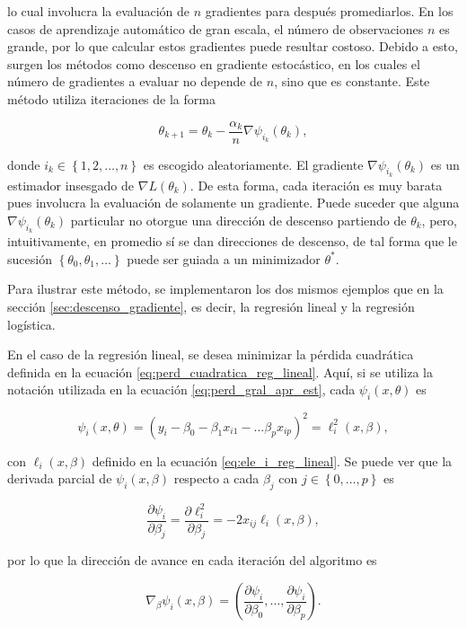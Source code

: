 lo cual involucra la evaluación de $n$ gradientes para después promediarlos. En los casos de aprendizaje automático de gran escala, el número de observaciones $n$ es grande, por lo que calcular estos gradientes puede resultar costoso. Debido a esto, surgen los métodos como descenso en gradiente estocástico, en los cuales el número de gradientes a evaluar no depende de $n$, sino que es constante. Este método utiliza iteraciones de la forma

\[
  \theta_{k+1} = \theta_k - \frac{\alpha_k}{n} \nabla \psi_{i_k}(\theta_k),
\]

donde $i_k \in \left\{1, 2, \hdots, n \right\}$ es escogido aleatoriamente. El gradiente $\nabla \psi_{i_k}(\theta_k)$ es un estimador insesgado de $\nabla L(\theta_k)$. De esta forma, cada iteración es muy barata pues involucra la evaluación de solamente un gradiente. Puede suceder que alguna $\nabla \psi_{i_k}(\theta_k)$ particular no otorgue una dirección de descenso partiendo de $\theta_k$, pero, intuitivamente, en promedio sí se dan direcciones de descenso, de tal forma que le sucesión $\left\{ \theta_0, \theta_1, \hdots \right\}$ puede ser guiada a un minimizador $\theta^*$.

Para ilustrar este método, se implementaron los dos mismos ejemplos que en la sección \ref{sec:descenso_gradiente}, es decir, la regresión lineal y la regresión logística.



En el caso de la regresión lineal, se desea minimizar la pérdida cuadrática definida en la ecuación \ref{eq:perd_cuadratica_reg_lineal}. Aquí, si se utiliza la notación utilizada en la ecuación \ref{eq:perd_gral_apr_est}, cada $\psi_i(x, \theta)$ es 

$$
  \psi_i(x, \theta) = \left( y_i - \beta_0 - \beta_1 x_{i1} - \hdots  \beta_p x_{ip} \right)^2 = \ell_i^2(x, \beta),
$$ 

con $\ell_i(x, \beta)$ definido en la ecuación \ref{eq:ele_i_reg_lineal}. Se puede ver que la derivada parcial de $\psi_i(x, \beta)$ respecto a cada $\beta_j$ con $j \in \left\{ 0, \hdots, p \right\}$ es

\[
  \frac{\partial \psi_i}{\partial \beta_j} = \frac{\partial \ell^2_i}{\partial \beta_j} = -2 x_{ij} \ell_i(x, \beta),
\]

por lo que la dirección de avance en cada iteración del algoritmo es

\[
  \nabla_{\beta} \psi_i(x, \beta) = 
    \left( \frac{\partial \psi_i}{\partial \beta_0}, \hdots, \frac{\partial \psi_i}{\partial \beta_p} \right).
\]

